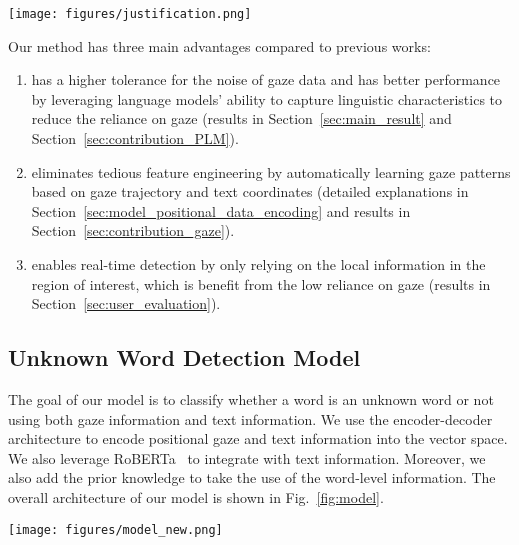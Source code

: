 \begin{figure*}
  \centering
   \texttt{[image: figures/justification.png]}
  \caption{Methodology for Detecting Unknown Words Using Integrated Text and Gaze Information. This integrated approach leverages both linguistic and user-dependent factors to effectively identify unknown words.}
  \label{fig:justification} 
\end{figure*}

Our method has three main advantages compared to previous works:
\begin{enumerate}
    \item \name{} has a higher tolerance for the noise of gaze data and has better performance by leveraging language models' ability to capture linguistic characteristics to reduce the reliance on gaze (results in Section~\ref{sec:main_result} and Section~\ref{sec:contribution_PLM}).
    \item \name{} eliminates tedious feature engineering by automatically learning gaze patterns based on gaze trajectory and text coordinates (detailed explanations in Section~\ref{sec:model_positional_data_encoding} and results in Section~\ref{sec:contribution_gaze}).
    \item \name{} enables real-time detection by only relying on the local information in the region of interest, which is benefit from the low reliance on gaze (results in Section~\ref{sec:user_evaluation}).
\end{enumerate}

\subsection{Unknown Word Detection Model}
\label{sec:method_model}
The goal of our model is to classify whether a word is an unknown word or not using both gaze information and text information. We use the encoder-decoder architecture to encode positional gaze and text information into the vector space. We also leverage RoBERTa~\cite{liu2019roberta} to integrate with text information. Moreover, we also add the prior knowledge to take the use of the word-level information. The overall architecture of our model is shown in Fig.~\ref{fig:model}.

\begin{figure*}[htbp]
  \centering
  \texttt{[image: figures/model\_new.png]}
  \caption{Our model includes an encoder-decoder model to encode positional data, a pre-trained RoBERTa to encode text information, and learnable embeddings to encode the knowledge. The concatenation of these three matrices is input to a binary classifier.}
  \label{fig:model} 
\end{figure*}

